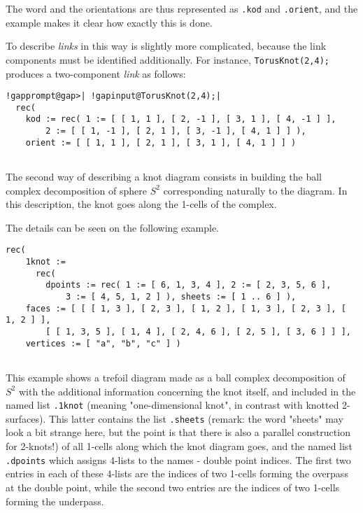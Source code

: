 \documentclass[a4paper,11pt]{report}
\begin{document}
{{{\begin{Verbatim}[commandchars=!@|,fontsize=\small,frame=single,label=Example]
\end{Verbatim}
 The word and the orientations are thus represented as \texttt{.kod} and \texttt{.orient}, and the example makes it clear how exactly this is done.  

 To describe \emph{links} in this way is slightly more complicated, because the link components must be
identified additionally. For instance, \texttt{TorusKnot(2,4);} produces a two-component \emph{link} as follows: 
\begin{Verbatim}[commandchars=!@|,fontsize=\small,frame=single,label=Example]
  !gapprompt@gap>| !gapinput@TorusKnot(2,4);|
  rec( 
    kod := rec( 1 := [ [ 1, 1 ], [ 2, -1 ], [ 3, 1 ], [ 4, -1 ] ], 
        2 := [ [ 1, -1 ], [ 2, 1 ], [ 3, -1 ], [ 4, 1 ] ] ), 
    orient := [ [ 1, 1 ], [ 2, 1 ], [ 3, 1 ], [ 4, 1 ] ] )
                  
\end{Verbatim}
  The second way of describing a knot diagram consists in building the ball
complex decomposition of sphere $S^2$ corresponding naturally to the diagram. In this description, the knot goes
along the 1-cells of the complex.  

 The details can be seen on the following example. 
\begin{Verbatim}[commandchars=!@|,fontsize=\small,frame=single,label=Example]
  rec(
    1knot :=
      rec(
        dpoints := rec( 1 := [ 6, 1, 3, 4 ], 2 := [ 2, 3, 5, 6 ],
            3 := [ 4, 5, 1, 2 ] ), sheets := [ 1 .. 6 ] ),
    faces := [ [ [ 1, 3 ], [ 2, 3 ], [ 1, 2 ], [ 1, 3 ], [ 2, 3 ], [ 1, 2 ] ],
        [ [ 1, 3, 5 ], [ 1, 4 ], [ 2, 4, 6 ], [ 2, 5 ], [ 3, 6 ] ] ],
    vertices := [ "a", "b", "c" ] )
  			
\end{Verbatim}
 This example shows a trefoil diagram made as a ball complex decomposition of $S^2$ with the additional information concerning the knot itself, and included in
the named list \texttt{.1knot} (meaning "one-dimensional knot", in contrast with knotted 2-surfaces). This
latter contains the list \texttt{.sheets} (remark: the word "sheets" may look a bit strange here, but the point is that
there is also a parallel construction for 2-knots!) of all 1-cells along which
the knot diagram goes, and the named list \texttt{.dpoints} which assigns 4-lists to the names - double point indices. The first two
entries in each of these 4-lists are the indices of two 1-cells forming the
overpass at the double point, while the second two entries are the indices of
two 1-cells forming the underpass.  

}}}
\end{document}
